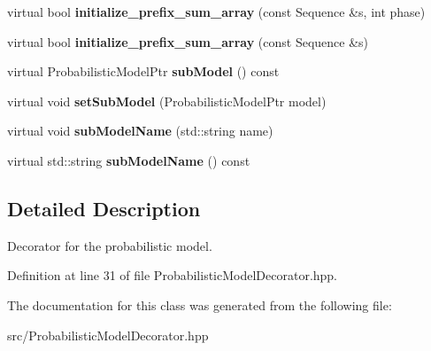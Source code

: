 \begin{DoxyCompactItemize}
\item 
\mbox{\label{classtops_1_1ProbabilisticModelDecorator_a5ed45d503653df9e8508197165eeed1b}} 
virtual bool {\bfseries initialize\+\_\+prefix\+\_\+sum\+\_\+array} (const Sequence \&s, int phase)
\item 
\mbox{\label{classtops_1_1ProbabilisticModelDecorator_a2a895846bde499b0bd827ae1581596b3}} 
virtual bool {\bfseries initialize\+\_\+prefix\+\_\+sum\+\_\+array} (const Sequence \&s)
\item 
\mbox{\label{classtops_1_1ProbabilisticModelDecorator_a116b5636f9c45d50cd8d5631e9437e27}} 
virtual Probabilistic\+Model\+Ptr {\bfseries sub\+Model} () const
\item 
\mbox{\label{classtops_1_1ProbabilisticModelDecorator_a399a342705d6908bedb41153dd53c94b}} 
virtual void {\bfseries set\+Sub\+Model} (Probabilistic\+Model\+Ptr model)
\item 
\mbox{\label{classtops_1_1ProbabilisticModelDecorator_a7a08f400761e5bdc237e66d1dfa2c2dd}} 
virtual void {\bfseries sub\+Model\+Name} (std\+::string name)
\item 
\mbox{\label{classtops_1_1ProbabilisticModelDecorator_a8541470b86c6ed2e9d545b3e6bf6148d}} 
virtual std\+::string {\bfseries sub\+Model\+Name} () const
\end{DoxyCompactItemize}


\subsection{Detailed Description}
Decorator for the probabilistic model. 

Definition at line 31 of file Probabilistic\+Model\+Decorator.\+hpp.



The documentation for this class was generated from the following file\+:\begin{DoxyCompactItemize}
\item 
src/Probabilistic\+Model\+Decorator.\+hpp\end{DoxyCompactItemize}
